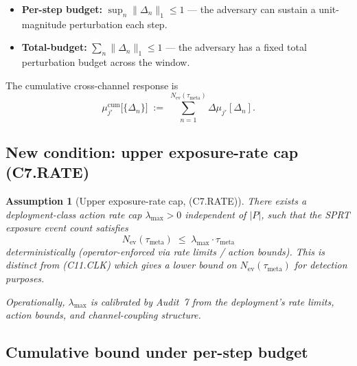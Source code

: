 \documentclass{article}
\newtheorem{assumption}{Assumption}
\newcommand{\Nev}{N_{\mathrm{ev}}}
\newcommand{\lammax}{\lambda_{\max}}
\newcommand{\taumeta}{\tau_{\mathrm{meta}}}
\begin{document}
\begin{itemize}
\item \textbf{Per-step budget:} $\sup_n \|\Delta_n\|_1 \leq 1$ ---
  the adversary can sustain a unit-magnitude perturbation each
  step.
\item \textbf{Total-budget:} $\sum_n \|\Delta_n\|_1 \leq 1$ --- the
  adversary has a fixed total perturbation budget across the
  window.
\end{itemize}

The cumulative cross-channel response is
\[
  \mu_{j'}^{\mathrm{cum}}\big[\{\Delta_n\}\big]
  \;:=\; \sum_{n=1}^{\Nev(\taumeta)} \Delta\mu_{j'}[\Delta_n].
\]

\subsection{New condition: upper exposure-rate cap (C7.RATE)}

\begin{assumption}[Upper exposure-rate cap, (C7.RATE)]
\label{ass:c7-rate}
There exists a deployment-class action rate cap $\lammax > 0$
independent of $|P|$, such that the SPRT exposure event count
satisfies
\begin{equation}
\label{eq:c7-rate}
  \Nev(\taumeta) \;\leq\; \lammax \cdot \taumeta
\end{equation}
deterministically (operator-enforced via rate limits / action
bounds).  This is distinct from (C11.CLK) which gives a lower
bound on $\Nev(\taumeta)$ for detection purposes.

Operationally, $\lammax$ is calibrated by Audit~7 from the
deployment's rate limits, action bounds, and channel-coupling
structure.
\end{assumption}

\subsection{Cumulative bound under per-step budget}
\end{document}
